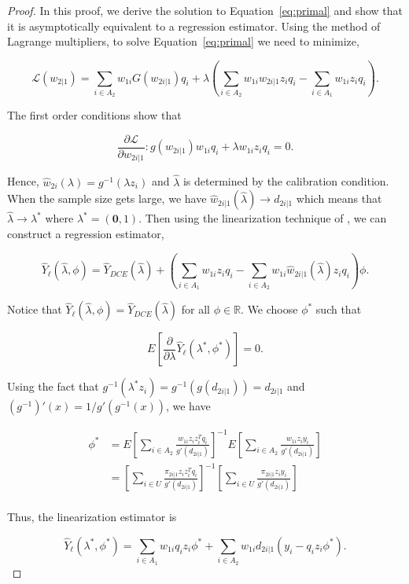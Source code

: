 \documentclass[12pt]{article}
\renewcommand{\bf}[1]{\mathbf{#1}}
\begin{document}
\begin{proof}
  In this proof, we derive the solution to Equation~\ref{eq:primal} and show
  that it is asymptotically equivalent to a regression estimator. Using the
  method of Lagrange multipliers, to solve Equation~\ref{eq:primal} we need to
  minimize,

  $$\mathcal{L}(w_{2|1}) = \sum_{i \in A_2} w_{1i} G(w_{2i|1}) q_i + 
  \lambda \left(\sum_{i \in A_2} w_{1i} w_{2i|1} z_i q_i - \sum_{i \in A_1} w_{1i}
  z_i q_i\right).$$

  The first order conditions show that

  $$\frac{\partial \mathcal{L}}{\partial w_{2i|1}}: g(w_{2i|1}) w_{1i}q_i +
    \lambda w_{1i} z_i q_i = 0.$$

  Hence, $\hat w_{2i}(\lambda) = g^{-1}(\lambda z_i)$ and $\hat \lambda$ is
  determined by the calibration condition. When the sample size gets large, we
  have $\hat w_{2i|1}(\hat \lambda) \to d_{2i|1}$ which means that $\hat \lambda
  \to \lambda^*$ where $\lambda^* = (\bf 0, 1)$. Then using the linearization
  technique of \cite{randles1982asymptotic}, we can construct a regression
  estimator, 

  $$\hat Y_\ell(\hat \lambda, \phi)  = \hat Y_{DCE}(\hat \lambda) + 
  \left(\sum_{i \in A_1} w_{1i} z_i q_i - \sum_{i \in A_2} w_{1i} \hat w_{2i|1}(\hat
  \lambda) z_i q_i\right)\phi.$$

  Notice that $\hat Y_\ell(\hat \lambda, \phi) = \hat Y_{DCE}(\hat \lambda)$ for
  all $\phi \in \mathbb{R}$. We choose $\phi^*$ such that

  $$E\left[\frac{\partial}{\partial \lambda} \hat Y_\ell(\lambda^*, \phi^*)\right]=0.$$

  Using the fact that $g^{-1}(\lambda^* z_i) = g^{-1}(g(d_{2i|1})) = d_{2i|1}$
  and $(g^{-1})'(x) = 1 / g'(g^{-1}(x))$, we have

  \begin{align*}
    \phi^*
    &= E\left[\sum_{i \in A_2} \frac{w_{1i}z_i z_i^T q_i}{g'(d_{2i|1})}\right]^{-1}
    E\left[\sum_{i \in A_2} \frac{w_{1i}z_i y_i}{g'(d_{2i|1})}\right]\\
    &= \left[\sum_{i \in U} \frac{\pi_{2i|1}z_i z_i^T q_i}{g'(d_{2i|1})}\right]^{-1}
    \left[\sum_{i \in U} \frac{\pi_{2i|1} z_i y_i}{g'(d_{2i|1})}\right]\\
  \end{align*}

  Thus, the linearization estimator is

  $$\hat Y_\ell(\lambda^*, \phi^*) = \sum_{i \in A_1} w_{1i} q_i z_i \phi^* +
  \sum_{i \in A_2} w_{1i} d_{2i|1} (y_i - q_i z_i \phi^*).$$


\end{proof}
\end{document}
